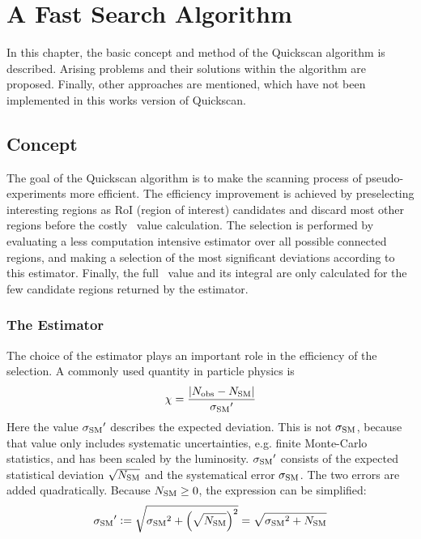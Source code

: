 
\chapter{A Fast Search Algorithm}

In this chapter, the basic concept and method of the Quickscan algorithm is described. Arising problems and their solutions within the algorithm are proposed. Finally, other approaches are mentioned, which have not been implemented in this works version of Quickscan.

\section{Concept}
The goal of the Quickscan algorithm is to make the scanning process of pseudo-experiments more efficient. The efficiency improvement is achieved by preselecting interesting regions as RoI (region of interest) candidates and discard most other regions before the costly \p~value calculation.
The selection is performed by evaluating a less computation intensive estimator over all possible connected regions, and making a selection of the most significant deviations according to this estimator. Finally, the full \p~value and its integral are only calculated for the few candidate regions returned by the estimator.

\subsection{The Estimator}
The choice of the estimator plays an important role in the efficiency of the selection. A commonly used quantity in particle physics is 
\begin{equation}
\chi = \frac{|{N_\mathrm{obs}} - {N_\mathrm{SM}}|}{{\sigma_\mathrm{SM}}'}
\end{equation}
Here the value ${\sigma_\mathrm{SM}}'$ describes the expected deviation. This is not ${\sigma_\mathrm{SM}}$, because that value only includes systematic uncertainties, e.g. finite Monte-Carlo statistics, and has been scaled by the luminosity.
${\sigma_\mathrm{SM}}'$ consists of the expected statistical deviation $\sqrt{{N_\mathrm{SM}}}$ and the systematical error ${\sigma_\mathrm{SM}}$. The two errors are added quadratically. Because ${N_\mathrm{SM}} \geq \num{0}$, the expression can be simplified:
\begin{equation}
{\sigma_\mathrm{SM}}' \vcentcolon= \sqrt{{\sigma_\mathrm{SM}}^2 + \left(\sqrt{{N_\mathrm{SM}}}\right)^2} = \sqrt{{\sigma_\mathrm{SM}}^2 + {N_\mathrm{SM}}}
\end{equation}

